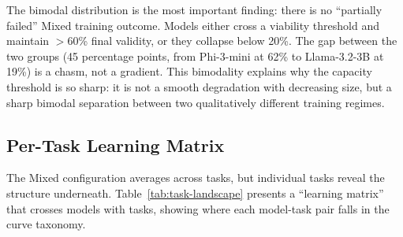 \documentclass[11pt]{article}
\begin{document}
The bimodal distribution is the most important finding: there is no ``partially failed'' Mixed training outcome.  Models either cross a viability threshold and maintain $>$60\% final validity, or they collapse below 20\%.  The gap between the two groups (45 percentage points, from Phi-3-mini at 62\% to Llama-3.2-3B at 19\%) is a chasm, not a gradient.  This bimodality explains why the capacity threshold is so sharp: it is not a smooth degradation with decreasing size, but a sharp bimodal separation between two qualitatively different training regimes.

\subsection{Per-Task Learning Matrix}

The Mixed configuration averages across tasks, but individual tasks reveal the structure underneath.  Table~\ref{tab:task-landscape} presents a ``learning matrix'' that crosses models with tasks, showing where each model-task pair falls in the curve taxonomy.
\end{document}
